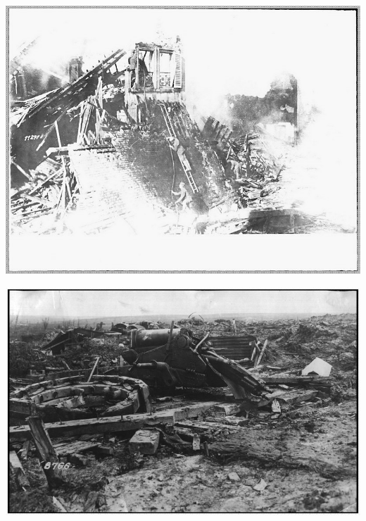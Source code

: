 \begin{center}
\includegraphics[width=\textwidth]{chast-vosp/zver/vz002.jpg}
\end{center}
\vspace*{\fill}

\newpage

\vspace*{\fill}
\begin{center}
\includegraphics[width=\textwidth]{chast-vosp/zver/vz003.jpg}
\end{center}

